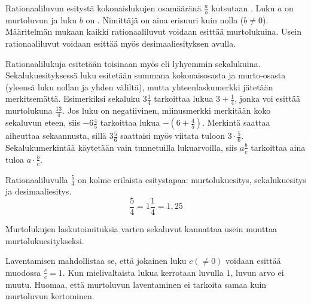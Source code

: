Rationaaliluvun esitystä kokonaislukujen osamääränä
$\frac{a}{b}$ kutsutaan . Luku $a$ on murtoluvun
 ja luku $b$ on
. Nimittäjä on aina erisuuri kuin nolla ($b\neq0 $). Määritelmän mukaan kaikki rationaaliluvut
voidaan esittää murtolukuina. Usein rationaaliluvut voidaan esittää myös desimaaliesityksen avulla.


Rationaalilukuja esitetään toisinaan myös  eli lyhyemmin
sekalukuina. Sekalukuesityksessä luku esitetään summana kokonaisosasta ja murto-osasta (yleensä luku nollan
ja yhden väliltä), mutta yhteenlaskumerkki jätetään merkitsemättä. Esimerkiksi sekaluku $3\frac{1}{4}$
tarkoittaa lukua $3 + \frac{1}{4}$, jonka voi esittää murtolukuna $\frac{13}{4}$. Jos luku on negatiivinen,
miinusmerkki merkitään koko sekaluvun eteen, siis $-6\frac{4}{5}$ tarkoittaa lukua $-(6 + \frac{4}{5})$.
Merkintä saattaa aiheuttaa sekaannusta, sillä $3\frac{5}{6}$ saattaisi myös viitata tuloon
$3\cdot \frac{5}{6}$. Sekalukumerkintää käytetään vain tunnetuilla lukuarvoilla, siis $a\frac{b}{c}$ tarkoittaa aina
tuloa $a\cdot \frac{b}{c}$. 

\begin{esimerkki}
        Rationaaliluvulla $\frac{5}{4}$ on kolme erilaista esitystapaa: murtolukuesitys, sekalukuesitys ja desimaaliesitys.
        \[\frac{5}{4} = 1\frac{1}{4}=1,25 \]
    \end{esimerkki}

Murtolukujen laskutoimituksia varten sekaluvut kannattaa usein muuttaa murtolukuesitykseksi. 
\newpage


Laventamisen mahdollistaa se, että jokainen luku $c(\neq0)$ voidaan esittää muodossa $\frac{c}{c}=1$. Kun mielivaltaista lukua kerrotaan luvulla $1$, luvun arvo ei muutu. Huomaa, että murtoluvun laventaminen ei tarkoita samaa kuin murtoluvun kertominen.

